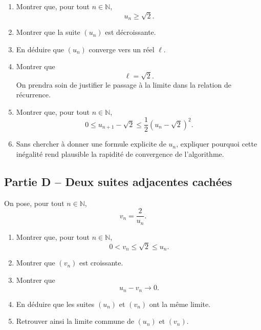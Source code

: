 \documentclass[11pt,a4paper]{article}
\newcommand{\N}{\mathbb{N}}
\begin{document}
\begin{enumerate}[resume]
    \item Montrer que, pour tout \(n\in\N\),
    \[
    u_n\geq \sqrt{2}.
    \]

    \item Montrer que la suite \((u_n)\) est décroissante.

    \item En déduire que \((u_n)\) converge vers un réel \(\ell\).

    \item Montrer que
    \[
    \ell=\sqrt{2}.
    \]
    On prendra soin de justifier le passage à la limite dans la relation de récurrence.

    \item Montrer que, pour tout \(n\in\N\),
    \[
    0\leq u_{n+1}-\sqrt{2}
    \leq \frac12\left(u_n-\sqrt{2}\right)^2.
    \]

    \item Sans chercher à donner une formule explicite de \(u_n\), expliquer pourquoi cette inégalité rend plausible la rapidité de convergence de l'algorithme.
\end{enumerate}


\subsection*{Partie D -- Deux suites adjacentes cachées}

On pose, pour tout \(n\in\N\),
\[
v_n=\frac{2}{u_n}.
\]

\begin{enumerate}[resume]
    \item Montrer que, pour tout \(n\in\N\),
    \[
    0<v_n\leq \sqrt{2}\leq u_n.
    \]

    \item Montrer que \((v_n)\) est croissante.

    \item Montrer que
    \[
    u_n-v_n \longrightarrow 0.
    \]

    \item En déduire que les suites \((u_n)\) et \((v_n)\) ont la même limite.

    \item Retrouver ainsi la limite commune de \((u_n)\) et \((v_n)\).
\end{enumerate}

\newpage
\end{document}

